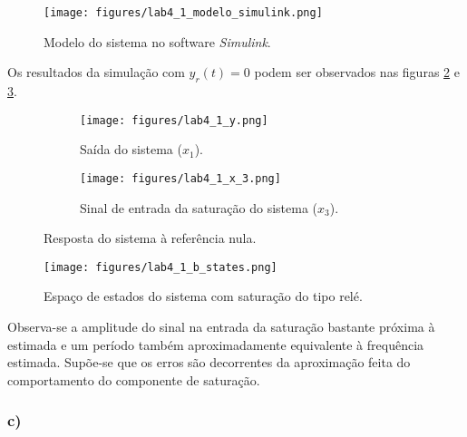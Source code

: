 \documentclass[a4paper]{report}
\begin{document}
\begin{figure}[H]
    \centering
    \texttt{[image: figures/lab4\_1\_modelo\_simulink.png]}
    \caption{Modelo do sistema no software \emph{Simulink}.}
    \label{fig:figures-lab4_1_modelo_simulink-png}
\end{figure}

Os resultados da simulação com $y_r(t)=0$ podem ser observados nas figuras \ref{fig:figures-lab4_1_resposta_simulink} e \ref{fig:figures-lab4_1_b_states-png}.

\begin{figure}[H]
    \centering
    \begin{subfigure}{0.45\textwidth}
	\texttt{[image: figures/lab4\_1\_y.png]}
	\caption{Saída do sistema ($x_1$).}
    \end{subfigure}
    \begin{subfigure}{0.45\textwidth}
	\texttt{[image: figures/lab4\_1\_x\_3.png]}
	\caption{Sinal de entrada da saturação do sistema ($x_3$).}
    \end{subfigure}
    \caption{Resposta do sistema à referência nula.}
    \label{fig:figures-lab4_1_resposta_simulink}
\end{figure}

\begin{figure}[H]
    \centering
    \texttt{[image: figures/lab4\_1\_b\_states.png]}
    \caption{Espaço de estados do sistema com saturação do tipo relé.}
    \label{fig:figures-lab4_1_b_states-png}
\end{figure}

Observa-se a amplitude do sinal na entrada da saturação bastante próxima à estimada e um período também aproximadamente equivalente à frequência estimada. Supõe-se que os erros são decorrentes da aproximação feita do comportamento do componente de saturação.

\subsubsection*{c)}
\end{document}
